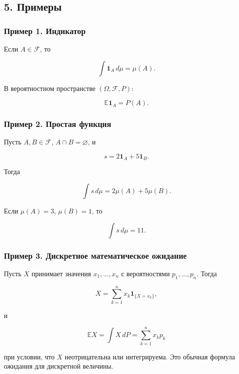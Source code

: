 \documentclass[
  11pt,
  a4paper,
]{article}
\begin{document}
\subsection{5. Примеры}\label{ux43fux440ux438ux43cux435ux440ux44b}

\subsubsection{Пример 1.
Индикатор}\label{ux43fux440ux438ux43cux435ux440-1.-ux438ux43dux434ux438ux43aux430ux442ux43eux440}

Если \(A\in\mathcal F\), то

\[
\int \mathbf 1_A\,d\mu=\mu(A).
\]

В вероятностном пространстве \((\Omega,\mathcal F,P)\):

\[
\mathbb E\mathbf 1_A=P(A).
\]

\subsubsection{Пример 2. Простая
функция}\label{ux43fux440ux438ux43cux435ux440-2.-ux43fux440ux43eux441ux442ux430ux44f-ux444ux443ux43dux43aux446ux438ux44f}

Пусть \(A,B\in\mathcal F\), \(A\cap B=\varnothing\), и

\[
s=2\mathbf 1_A+5\mathbf 1_B.
\]

Тогда

\[
\int s\,d\mu=2\mu(A)+5\mu(B).
\]

Если \(\mu(A)=3\), \(\mu(B)=1\), то

\[
\int s\,d\mu=11.
\]

\subsubsection{Пример 3. Дискретное математическое
ожидание}\label{ux43fux440ux438ux43cux435ux440-3.-ux434ux438ux441ux43aux440ux435ux442ux43dux43eux435-ux43cux430ux442ux435ux43cux430ux442ux438ux447ux435ux441ux43aux43eux435-ux43eux436ux438ux434ux430ux43dux438ux435}

Пусть \(X\) принимает значения \(x_1,\ldots,x_n\) с вероятностями
\(p_1,\ldots,p_n\). Тогда

\[
X=\sum_{k=1}^n x_k\mathbf 1_{\{X=x_k\}},
\]

и

\[
\mathbb E X=\int X\,dP=\sum_{k=1}^n x_kp_k
\]

при условии, что \(X\) неотрицательна или интегрируема. Это обычная
формула ожидания для дискретной величины.
\end{document}

